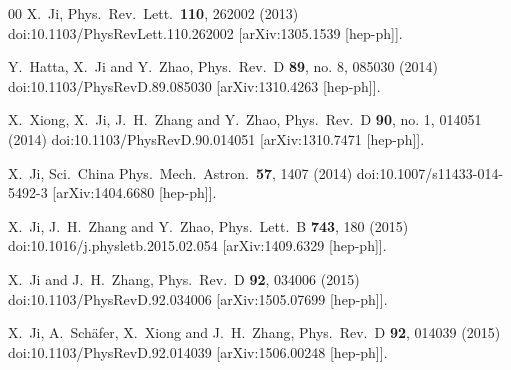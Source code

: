 \begin{thebibliography}{00}
	X.~Ji,
	Phys.\ Rev.\ Lett.\  {\bf 110}, 262002 (2013)
	doi:10.1103/PhysRevLett.110.262002
	[arXiv:1305.1539 [hep-ph]].


	Y.~Hatta, X.~Ji and Y.~Zhao,
	Phys.\ Rev.\ D {\bf 89}, no. 8, 085030 (2014)
	doi:10.1103/PhysRevD.89.085030
	[arXiv:1310.4263 [hep-ph]].


	X.~Xiong, X.~Ji, J.~H.~Zhang and Y.~Zhao,
	Phys.\ Rev.\ D {\bf 90}, no. 1, 014051 (2014)
	doi:10.1103/PhysRevD.90.014051
	[arXiv:1310.7471 [hep-ph]].


	X.~Ji,
	Sci.\ China Phys.\ Mech.\ Astron.\  {\bf 57}, 1407 (2014)
	doi:10.1007/s11433-014-5492-3
	[arXiv:1404.6680 [hep-ph]].


	X.~Ji, J.~H.~Zhang and Y.~Zhao,
	Phys.\ Lett.\ B {\bf 743}, 180 (2015)
	doi:10.1016/j.physletb.2015.02.054
	[arXiv:1409.6329 [hep-ph]].


	X.~Ji and J.~H.~Zhang,
	Phys.\ Rev.\ D {\bf 92}, 034006 (2015)
	doi:10.1103/PhysRevD.92.034006
	[arXiv:1505.07699 [hep-ph]].


	X.~Ji, A.~Sch\"afer, X.~Xiong and J.~H.~Zhang,
	Phys.\ Rev.\ D {\bf 92}, 014039 (2015)
	doi:10.1103/PhysRevD.92.014039
	[arXiv:1506.00248 [hep-ph]].



\end{thebibliography}
